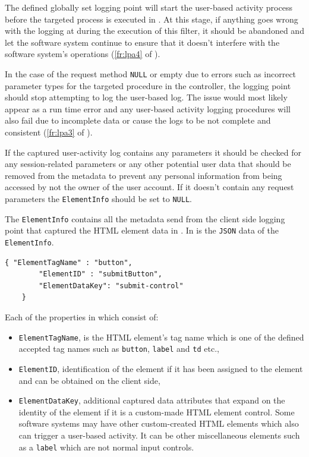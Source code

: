 The defined globally set logging point will start the user-based activity process before the targeted process is executed in . At this stage, if anything goes wrong with the logging at during the execution of this filter, it should be abandoned and let the software system continue to ensure that it doesn't interfere with the software system's operations (\ref{fr:lpa4} of ).\par In the case of the request method \texttt{NULL} or empty due to errors such as incorrect parameter types for the targeted procedure in the controller, the logging point should stop attempting to log the user-based log. The issue would most likely appear as a run time error and any user-based activity logging procedures will also fail due to incomplete data or cause the logs to be not complete and consistent (\ref{fr:lpa3} of ).\par If the captured user-activity log contains any parameters it should be checked for any session-related parameters or any other potential user data that should be removed from the metadata to prevent any personal information from being accessed by not the owner of the user account. If it doesn't contain any request parameters the \texttt{ElementInfo} should be set to \texttt{NULL}.\par The \texttt{ElementInfo} contains all the metadata send from the client side logging point that captured the HTML element data in . In  is the \texttt{JSON} data of the \texttt{ElementInfo}. 

\begin{lstlisting}[style=json, caption={\textit{Element properties JSON}}, label={fig:Ch2_ElementInfo}] 
	{ "ElementTagName" : "button",
		"ElementID" : "submitButton",
		"ElementDataKey": "submit-control"		
	}
\end{lstlisting}

Each of the properties in  which consist of:

\begin{itemize}
	\item \texttt{ElementTagName}, is the HTML element's tag name which is one of the defined accepted tag names such as \texttt{button}, \texttt{label} and \texttt{td} etc.,
	\item \texttt{ElementID}, identification of the element if it has been assigned to the element and can be obtained on the client side,
	\item \texttt{ElementDataKey}, additional captured data attributes that expand on the identity of the element if it is a custom-made HTML element control. Some software systems may have other custom-created HTML elements which also can trigger a user-based activity. It can be other miscellaneous elements such as a \texttt{label} which are not normal input controls.
\end{itemize}



